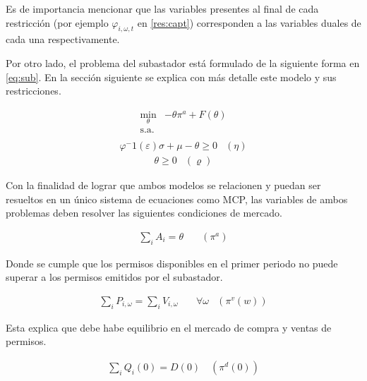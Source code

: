 Es de importancia mencionar que las variables presentes al final de cada restricción (por ejemplo $\varphi_{i,\omega,t}$ en \ref{res:capt}) corresponden a las variables duales de cada una respectivamente.
\vspace{2.5mm}

Por otro lado, el problema del subastador está formulado de la siguiente forma en \ref{eq:sub}. En la sección siguiente se explica con más detalle este modelo y sus restricciones.

\begin{equation}
\begin{array}{rrclcl}
    \displaystyle \min_{\theta} &-\theta \pi^a + F(\theta) \\\textrm{s.a.} \label{eq:sub}\\
\end{array}
\end{equation}
\begin{equation}
\begin{array}{cl}
    \varphi^-1 (\varepsilon )\sigma + \mu - \theta \geq 0 & (\eta) \label{res:sub1}
\end{array}
\end{equation}
\begin{equation}
\begin{array}{cl}
   \theta \geq 0 & (\varrho)\label{res:sub2}
\end{array}
\end{equation}

Con la finalidad de lograr que ambos modelos se relacionen y puedan ser resueltos en un único sistema de ecuaciones como MCP, las variables de ambos problemas deben resolver las siguientes condiciones de mercado.

\begin{align}
   \sum_{i}A_i = \theta  &\quad (\pi^a)\label{rescom:1}
\end{align}

Donde se cumple que los permisos disponibles en el primer periodo no puede superar a los permisos emitidos por el subastador.

\begin{align}
    \sum_{i}P_{i,\omega} = \sum_{i}V_{i,\omega} \quad& \forall \omega &(\pi^v (w))\label{rescom:2}
\end{align}
    


Esta explica que debe habe equilibrio en el mercado de compra y ventas de permisos.

\begin{align}
  \sum_{i}Q_i(0) = D(0) \quad (\pi^d (0))\label{rescom:3}  
\end{align}


